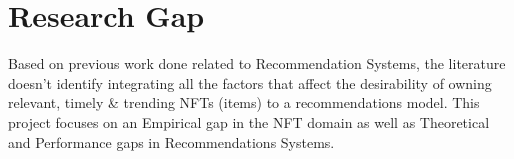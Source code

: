 







\section{Research Gap}
Based on previous work done related to Recommendation Systems, the literature doesn't identify integrating all the factors that affect the desirability of owning relevant, timely \& trending NFTs (items) to a recommendations model. This project focuses on an Empirical gap in the NFT domain as well as Theoretical and Performance gaps in Recommendations Systems. 


